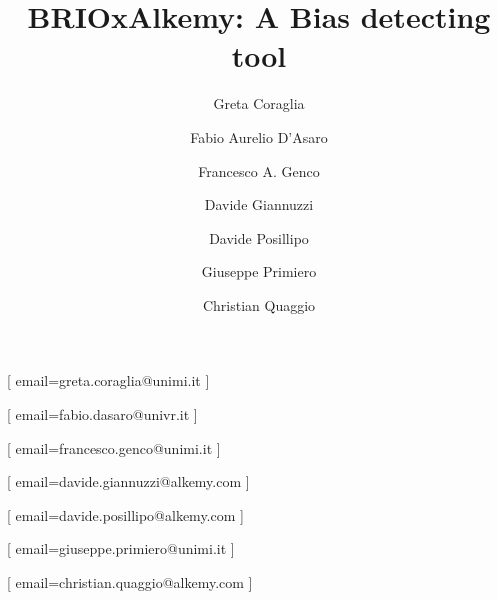 \documentclass[
]{ceurart}
\begin{document}


\title{BRIOxAlkemy: A Bias detecting tool}

\tnotemark[1]


\author[1]{Greta Coraglia}[
email=greta.coraglia@unimi.it
]
\author[3]{Fabio Aurelio D'Asaro}[
email=fabio.dasaro@univr.it
]
\author[1]{Francesco A. Genco}[%
email=francesco.genco@unimi.it
]
\author[2]{Davide Giannuzzi}[
  email=davide.giannuzzi@alkemy.com
  ]
\author[2]{Davide Posillipo}[
email=davide.posillipo@alkemy.com
]
\author[1]{Giuseppe Primiero}[
email=giuseppe.primiero@unimi.it
]
\author[2]{Christian Quaggio}[
email=christian.quaggio@alkemy.com
]


\address[1]{LUCI Group, Department of Philosophy, University of Milan, via Festa del Perdono 7, 20122 Milan, Italy}
\address[2]{Alkemy, Deep Learning \& Big Data Department}
\address[3]{Ethos Group, Department of Human Sciences, University of Verona, Lungadige Porta Vittoria 17, 37129 Verona, Italy}

\end{document}

